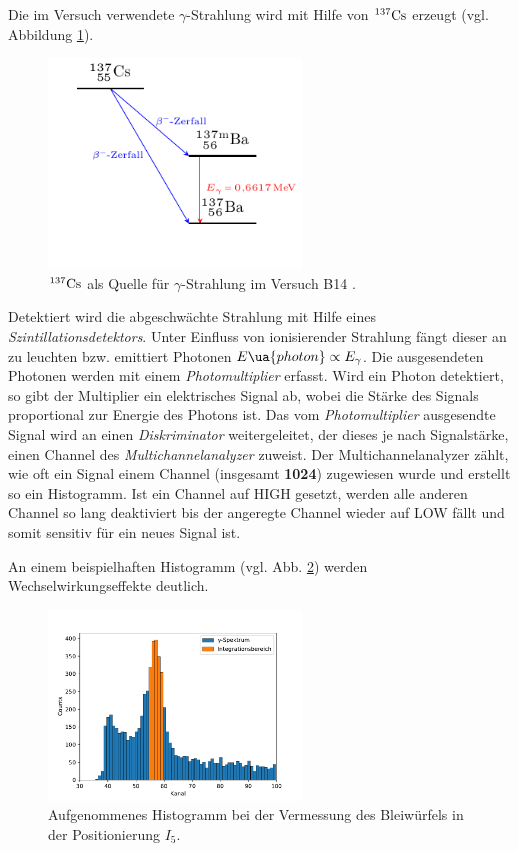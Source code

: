 Die im Versuch verwendete $\gamma$-Strahlung wird mit Hilfe von $^{137}\ce{Cs}$ erzeugt (vgl. Abbildung \ref{fig: zerfall}).

\begin{figure}[h]
  \centering
  \includegraphics[width=0.6\textwidth]{pics/tikz-Energieschema.pdf}
  \caption{$^{137}\ce{Cs}$ als Quelle für $\gamma$-Strahlung im Versuch B14 \cite{luckyjosh}.}
  \label{fig: zerfall}
\end{figure}

Detektiert wird die abgeschwächte Strahlung mit Hilfe eines \emph{Szintillationsdetektors}.
Unter Einfluss von ionisierender Strahlung fängt dieser an zu leuchten bzw. emittiert Photonen $E\ua{photon}\propto E_\gamma$.
Die ausgesendeten Photonen werden mit einem \emph{Photomultiplier} erfasst. Wird ein Photon detektiert,
so gibt der Multiplier ein elektrisches Signal ab, wobei die Stärke des Signals proportional zur Energie des Photons ist.
Das vom \emph{Photomultiplier} ausgesendte Signal
wird an einen \emph{Diskriminator} weitergeleitet, der dieses je nach Signalstärke, einen Channel des
\emph{Multichannelanalyzer} zuweist. Der Multichannelanalyzer zählt, wie oft ein Signal einem Channel (insgesamt \textbf{1024}) zugewiesen wurde und
erstellt so ein Histogramm. Ist ein Channel auf HIGH gesetzt, werden alle anderen Channel so lang deaktiviert
bis der angeregte Channel wieder auf LOW fällt und somit sensitiv für ein neues Signal ist.

An einem beispielhaften Histogramm (vgl. Abb. \ref{fig: histo}) werden Wechselwirkungseffekte deutlich.

\begin{figure}[h]
  \centering
  \includegraphics[width=0.6\textwidth]{hist/hist.pdf}
  \caption{Aufgenommenes Histogramm bei der Vermessung des Bleiwürfels in der Positionierung $I_5$.}
  \label{fig: histo}
\end{figure}
